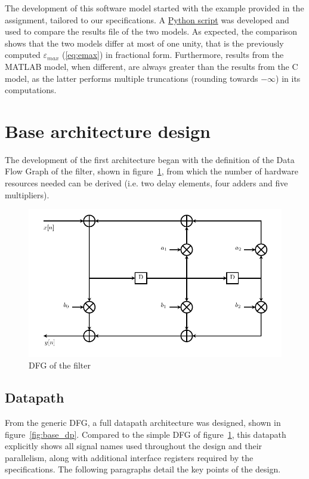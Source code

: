 \documentclass[a4paper]{article}
\begin{document}
The development of this software model started with the example provided in the assignment, tailored to our specifications. A \href{https://github.com/mksoc/ISA-filter-design/blob/master/common/compare-outputs.py}{Python script} was developed and used to compare the results file of the two models. As expected, the comparison shows that the two models differ at most of one unity, that is the previously computed $\varepsilon_{max}$ (\ref{eq:emax}) in fractional form. Furthermore, results from the MATLAB model, when different, are always greater than the results from the C model, as the latter performs multiple truncations (rounding towards $-\infty$) in its computations. 

\section{Base architecture design}
The development of the first architecture began with the definition of the Data Flow Graph of the filter, shown in figure~\ref{fig:base_dfg}, from which the number of hardware resources needed can be derived (i.e. two delay elements, four adders and five multipliers).

\begin{figure}[hbtp]
    \centering
    \includegraphics[width=.8\linewidth]{media/base_dfg.pdf}
    \caption{DFG of the filter}
    \label{fig:base_dfg}
\end{figure}

\subsection{Datapath}
From the generic DFG, a full datapath architecture was designed, shown in figure~\ref{fig:base_dp}. Compared to the simple DFG of figure~\ref{fig:base_dfg}, this datapath explicitly shows all signal names used throughout the design and their parallelism, along with additional interface registers required by the specifications. The following paragraphs detail the key points of the design. 
\end{document}
